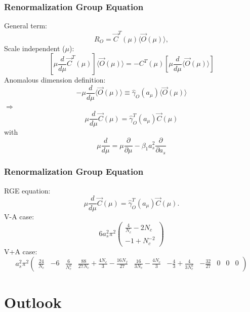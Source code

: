 \documentclass{beamer}
\begin{document}
\begin{frame}
\frametitle{Renormalization Group Equation}
General term:
\begin{equation*}
	R_O = \vec C^T (\mu) \langle \vec O(\mu) \rangle,
\end{equation*}
Scale independent ($\mu$):
\begin{equation*}
	\left[\mu \frac{d}{d\mu} \vec C^T(\mu) \right] \langle \vec O (\mu) \rangle = -C^T (\mu) \left[\mu \frac{d}{d\mu} \langle \vec O (\mu) \rangle \right]
\end{equation*}
Anomalous dimension definition:
\begin{equation*}
	-\mu\frac{d}{d\mu} \langle \vec O(\mu) \rangle \equiv \hat \gamma_O(a_\mu) \langle \vec O(\mu) \rangle 
\end{equation*}
$\Rightarrow$
\begin{equation*}
	\mu\frac{d}{d\mu} \vec C(\mu) = \hat \gamma^T_O(a_\mu) \vec C(\mu)
\end{equation*}
with
\begin{equation*}
	\mu \frac{d}{d \mu} = \mu \frac{\partial}{\partial \mu} - \beta_1 a_s^2 \frac{\partial}{\partial a_s}
\end{equation*}
\end{frame}

\begin{frame}
\frametitle{Renormalization Group Equation}
RGE equation:
\begin{equation*}
	\mu\frac{d}{d\mu} \vec C(\mu) = \hat \gamma^T_O(a_\mu) \vec C(\mu).
\end{equation*}
V-A case:
\begin{equation*}
	6 a^2_s \pi^2 
\begin{pmatrix}
	\frac{4}{N_c} - 2 N_c \\
	-1 + N_c^{-2}
\end{pmatrix}
\end{equation*}
V+A case:
\tiny
\begin{equation*}
	a^2_s \pi^2
\begin{pmatrix}
	\frac{24}{N_c} & -6 & \frac{6}{N_c^2} & \frac{88}{27 N_c} + \frac{4 N_c}{3} - \frac{16 N_f}{27} & \frac{16}{3N_c} - \frac{4 N_c}{3} & - \frac{4}{3} + \frac{4}{3N_c^2} & - \frac{32}{27} & 0 & 0 & 0
\end{pmatrix}
\end{equation*} 
\end{frame}

\section{Outlook}
\end{document}

